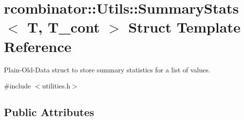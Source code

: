 \hypertarget{structrcombinator_1_1Utils_1_1SummaryStats}{}\section{rcombinator\+:\+:Utils\+:\+:Summary\+Stats$<$ T, T\+\_\+cont $>$ Struct Template Reference}
\label{structrcombinator_1_1Utils_1_1SummaryStats}


Plain-\/\+Old-\/\+Data struct to store summary statistics for a list of values.  




{\ttfamily \#include $<$utilities.\+h$>$}

\subsection*{Public Attributes}
